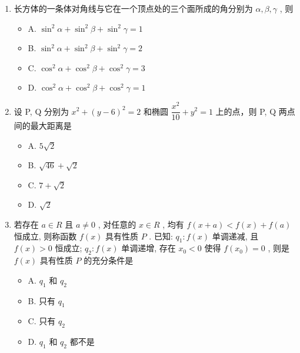 \documentclass[UTF8,12pt,a4paper]{ctexart}
\providecommand{\tightlist}{%
  \setlength{\itemsep}{0pt}\setlength{\parskip}{0pt}}
\begin{document}
\begin{enumerate}
  \begin{itemize}
  \tightlist
  \item
    A. 12
  \item
    B. 24
  \item
    C. 30
  \item
    D. 36
  \end{itemize}
\item
  长方体的一条体对角线与它在一个顶点处的三个面所成的角分别为 \(\alpha, \beta, \gamma\) , 则

  \begin{itemize}
  \tightlist
  \item
    A. \(\sin^{2}\alpha + \sin^{2}\beta + \sin^{2}\gamma = 1\)
  \item
    B. \(\sin^{2}\alpha + \sin^{2}\beta + \sin^{2}\gamma = 2\)
  \item
    C. \(\cos^{2}\alpha + \cos^{2}\beta + \cos^{2}\gamma = 3\)
  \item
    D. \(\cos^{2}\alpha + \cos^{2}\beta + \cos^{2}\gamma = 1\)
  \end{itemize}
\item
  设 P, Q 分别为 \(x^{2} + (y - 6)^{2} = 2\) 和椭圆 \(\dfrac{x^{2}}{10} + y^{2} = 1\) 上的点，则 P, Q 两点间的最大距离是

  \begin{itemize}
  \tightlist
  \item
    A. \(5\sqrt{2}\)
  \item
    B. \(\sqrt{46} + \sqrt{2}\)
  \item
    C. \(7 + \sqrt{2}\)
  \item
    D. \(\sqrt{2}\)
  \end{itemize}
\item
  若存在 \(a \in R\) 且 \(a \neq 0\) , 对任意的 \(x \in R\) , 均有 \(f(x + a) < f(x) + f(a)\) 恒成立, 则称函数 \(f(x)\) 具有性质 \(P\) . 已知: \(q_{1}: f(x)\) 单调递减, 且 \(f(x) > 0\) 恒成立; \(q_{2}: f(x)\) 单调递增, 存在 \(x_{0} < 0\) 使得 \(f(x_{0}) = 0\) , 则是 \(f(x)\) 具有性质 \(P\) 的充分条件是

  \begin{itemize}
  \tightlist
  \item
    A. \(q_{1}\) 和 \(q_{2}\)
  \item
    B. 只有 \(q_{1}\)
  \item
    C. 只有 \(q_{2}\)
  \item
    D. \(q_{1}\) 和 \(q_{2}\) 都不是
  \end{itemize}
\end{enumerate}
\end{document}

